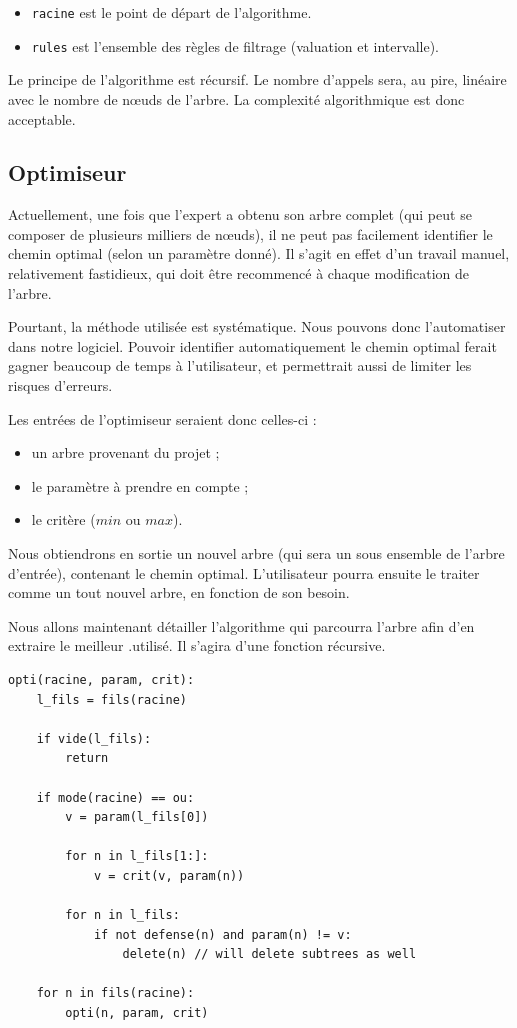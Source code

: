 		\begin{itemize}
			\item \verb|racine| est le point de départ de l'algorithme.
			\item \verb|rules| est l'ensemble des règles de filtrage (valuation et intervalle).
		\end{itemize}
	
		Le principe de l'algorithme est récursif.
		Le nombre d'appels sera, au pire, linéaire avec le nombre de nœuds de l'arbre.
		La complexité algorithmique est donc acceptable.

	\subsection{Optimiseur}
		Actuellement, une fois que l'expert a obtenu son arbre complet (qui peut se composer de plusieurs milliers de nœuds), il ne peut pas facilement identifier le chemin optimal (selon un paramètre donné).
		Il s'agit en effet d'un travail manuel, relativement fastidieux, qui doit être recommencé à chaque modification de l'arbre.
		
		Pourtant, la méthode utilisée est systématique. Nous pouvons donc l'automatiser dans notre logiciel. Pouvoir identifier automatiquement le chemin optimal ferait gagner beaucoup de temps à l'utilisateur, et permettrait aussi de limiter les risques d'erreurs.
		
		Les entrées de l'optimiseur seraient donc celles-ci :
		\begin{itemize}
			\item un arbre provenant du projet ;
			\item le paramètre à prendre en compte ;
			\item le critère ($min$ ou $max$).
		\end{itemize}
		
		Nous obtiendrons en sortie un nouvel arbre (qui sera un sous ensemble de l'arbre d'entrée), contenant le chemin optimal. 
		L'utilisateur pourra ensuite le traiter comme un tout nouvel arbre, en fonction de son besoin.
		
		Nous allons maintenant détailler l'algorithme qui parcourra l'arbre afin d'en extraire le meilleur %
		.utilisé. Il s'agira d'une fonction récursive.

		\begin{lstlisting}
opti(racine, param, crit):
	l_fils = fils(racine)

	if vide(l_fils):
		return

	if mode(racine) == ou:
		v = param(l_fils[0])

		for n in l_fils[1:]:
			v = crit(v, param(n))

		for n in l_fils:
			if not defense(n) and param(n) != v:
				delete(n) // will delete subtrees as well
	
	for n in fils(racine):
		opti(n, param, crit)
		\end{lstlisting}

